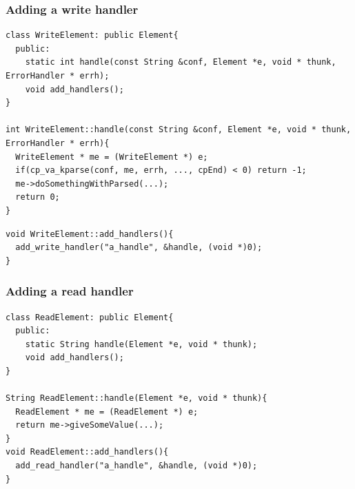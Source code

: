 \documentclass{beamer}
\begin{document}
\begin{frame}
\frametitle{Adding a write handler}
\begin{lstlisting}
class WriteElement: public Element{
  public:
    static int handle(const String &conf, Element *e, void * thunk, ErrorHandler * errh);
    void add_handlers();
}

int WriteElement::handle(const String &conf, Element *e, void * thunk, ErrorHandler * errh){
  WriteElement * me = (WriteElement *) e;
  if(cp_va_kparse(conf, me, errh, ..., cpEnd) < 0) return -1;
  me->doSomethingWithParsed(...);
  return 0;
}
\end{lstlisting}
\begin{lstlisting}
void WriteElement::add_handlers(){
  add_write_handler("a_handle", &handle, (void *)0);
}
\end{lstlisting}
\end{frame}

\begin{frame}[fragile]
\frametitle{Adding a read handler}
\begin{lstlisting}
class ReadElement: public Element{
  public:
    static String handle(Element *e, void * thunk);
    void add_handlers();
}

String ReadElement::handle(Element *e, void * thunk){
  ReadElement * me = (ReadElement *) e;
  return me->giveSomeValue(...);
}
void ReadElement::add_handlers(){
  add_read_handler("a_handle", &handle, (void *)0);
}
\end{lstlisting}
\end{frame}
\end{document}
